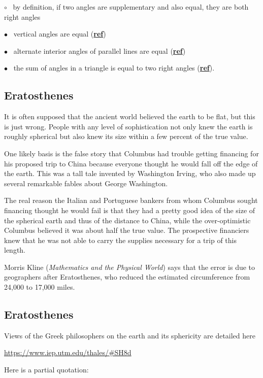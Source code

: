 \documentclass[11pt, oneside]{article}
\begin{document}
$\circ$ \ by definition, if two angles are supplementary and also equal, they are both right angles

$\bullet$ \ vertical angles are equal (\hyperref[sec:vertical_angle_theorem]{\textbf{ref}})

$\bullet$ \ alternate interior angles of parallel lines are equal (\hyperref[sec:alternate_interior_angle_theorem]{\textbf{ref}})

$\bullet$ \ the sum of angles in a triangle  is equal to two right angles  (\hyperref[sec:triangle_sum_theorem]{\textbf{ref}}).

\subsection*{Eratosthenes}

It is often supposed that the ancient world believed the earth to be flat, but this is just wrong.  People with any level of sophistication not only knew the earth is roughly spherical but also knew its size within a few percent of the true value.

One likely basis is the false story that Columbus had trouble getting financing for his proposed trip to China because everyone thought he would fall off the edge of the earth.  This was a tall tale invented by Washington Irving, who also made up several remarkable fables about George Washington.

The real reason the Italian and Portuguese bankers from whom Columbus sought financing thought he would fail is that they had a pretty good idea of the size of the spherical earth and thus of the distance to China, while the over-optimistic Columbus believed it was about half the true value.  The prospective financiers knew that he was not able to carry the supplies necessary for a trip of this length.

Morris Kline (\emph{Mathematics and the Physical World}) says that the error is due to geographers after Eratosthenes, who reduced the estimated circumference from 24,000 to 17,000 miles.

\subsection*{Eratosthenes}

Views of the Greek philosophers on the earth and its sphericity are detailed here

\url{https://www.iep.utm.edu/thales/#SH8d}

Here is a partial quotation:
\end{document}
